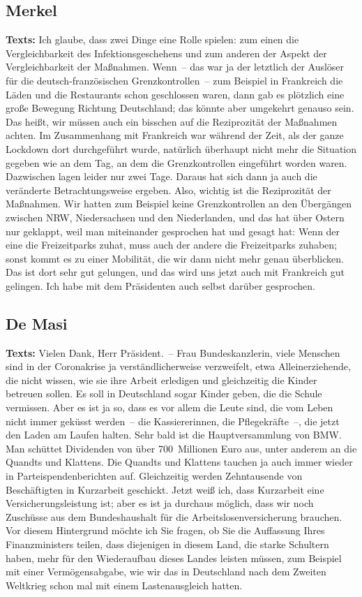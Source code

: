 \documentclass{article}
\begin{document}
\subsection{Merkel}
\noindent\textbf{Texts:} Ich glaube, dass zwei Dinge eine Rolle spielen: zum einen die Vergleichbarkeit des Infektionsgeschehens und zum anderen der Aspekt der Vergleichbarkeit der Maßnahmen. Wenn – das war ja der letztlich der Auslöser für die deutsch-französischen Grenzkontrollen – zum Beispiel in Frankreich die Läden und die Restaurants schon geschlossen waren, dann gab es plötzlich eine große Bewegung Richtung Deutschland; das könnte aber umgekehrt genauso sein. Das heißt, wir müssen auch ein bisschen auf die Reziprozität der Maßnahmen achten. Im Zusammenhang mit Frankreich war während der Zeit, als der ganze Lockdown dort durchgeführt wurde, natürlich überhaupt nicht mehr die Situation gegeben wie an dem Tag, an dem die Grenzkontrollen eingeführt worden waren. Dazwischen lagen leider nur zwei Tage. Daraus hat sich dann ja auch die veränderte Betrachtungsweise ergeben. Also, wichtig ist die Reziprozität der Maßnahmen. Wir hatten zum Beispiel keine Grenzkontrollen an den Übergängen zwischen NRW, Niedersachsen und den Niederlanden, und das hat über Ostern nur geklappt, weil man miteinander gesprochen hat und gesagt hat: Wenn der eine die Freizeitparks zuhat, muss auch der andere die Freizeitparks zuhaben; sonst kommt es zu einer Mobilität, die wir dann nicht mehr genau überblicken. Das ist dort sehr gut gelungen, und das wird uns jetzt auch mit Frankreich gut gelingen. Ich habe mit dem Präsidenten auch selbst darüber gesprochen.

\subsection{De Masi}
\noindent\textbf{Texts:} Vielen Dank, Herr Präsident. – Frau Bundeskanzlerin, viele Menschen sind in der Coronakrise ja verständlicherweise verzweifelt, etwa Alleinerziehende, die nicht wissen, wie sie ihre Arbeit erledigen und gleichzeitig die Kinder betreuen sollen. Es soll in Deutschland sogar Kinder geben, die die Schule vermissen. Aber es ist ja so, dass es vor allem die Leute sind, die vom Leben nicht immer geküsst werden – die Kassiererinnen, die Pflegekräfte –, die jetzt den Laden am Laufen halten. Sehr bald ist die Hauptversammlung von BMW. Man schüttet Dividenden von über 700 Millionen Euro aus, unter anderem an die Quandts und Klattens. Die Quandts und Klattens tauchen ja auch immer wieder in Parteispendenberichten auf. Gleichzeitig werden Zehntausende von Beschäftigten in Kurzarbeit geschickt. Jetzt weiß ich, dass Kurzarbeit eine Versicherungsleistung ist; aber es ist ja durchaus möglich, dass wir noch Zuschüsse aus dem Bundeshaushalt für die Arbeitslosenversicherung brauchen. Vor diesem Hintergrund möchte ich Sie fragen, ob Sie die Auffassung Ihres Finanzministers teilen, dass diejenigen in diesem Land, die starke Schultern haben, mehr für den Wiederaufbau dieses Landes leisten müssen, zum Beispiel mit einer Vermögensabgabe, wie wir das in Deutschland nach dem Zweiten Weltkrieg schon mal mit einem Lastenausgleich hatten.
\end{document}

